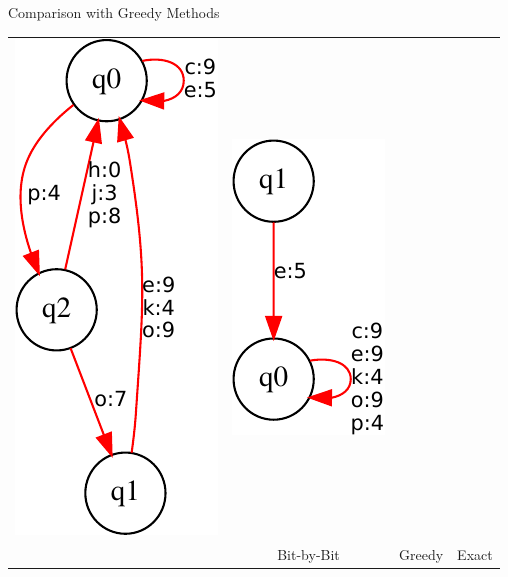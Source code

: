 \begin{tframe}{Comparison with Greedy Methods}
\begin{center}
\begin{tabular}{cccc}
\includegraphics[scale=0.4]{media_minrep/alberto}&
\includegraphics[scale=0.4]{media_minrep/exact}\\
& Bit-by-Bit & Greedy & Exact
\end{tabular}
\end{center}
\end{tframe}


